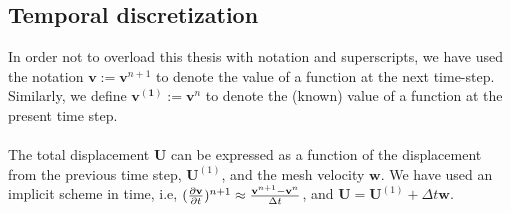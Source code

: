 \subsection{Temporal discretization}
In order not to overload this thesis with notation and superscripts, we have used the notation $\mathbf{v} := \mathbf{v}^{n+1}$ to denote the value of a function at the next time-step. Similarly, we define $\mathbf{v^{(1)}} := \mathbf{v}^n$ to denote the (known) value of a function at the present time step. 
\\
\\
The total displacement $\mathbf{U}$ can be expressed as a function of the displacement from the previous time step, $\mathbf{U}^{(1)}$, and the mesh velocity $\mathbf{w}$. We have used an implicit scheme in time, i.e, $(\frac{\partial \mathbf{v}}{\partial t})^{n+1} \approx \frac{\mathbf{v}^{n+1}-\mathbf{v}^{n}}{\Delta t} $, and $\mathbf{U} = \mathbf{U}^{(1)} + \Delta t \mathbf{w}$. 







